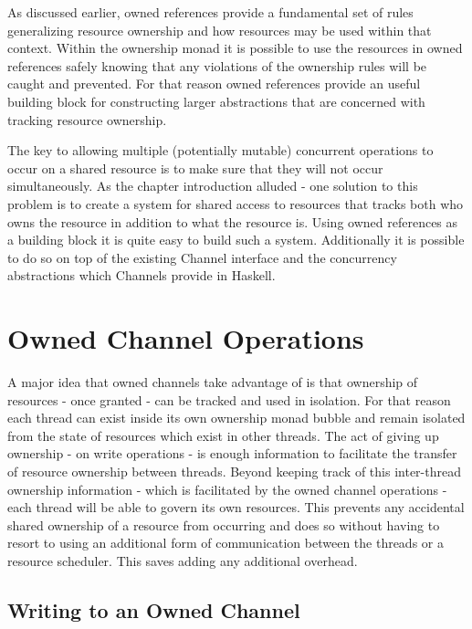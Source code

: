 \documentclass[onehalf,11pt]{beavtex}
\begin{document}
As discussed earlier, owned references provide a fundamental set of
rules generalizing resource ownership and how resources may be used within that
context.  Within the ownership monad it is possible to use the
resources in owned references safely knowing that any violations of
the ownership rules will be caught and prevented.  For that reason
owned references provide an useful building block for constructing
larger abstractions that are concerned with tracking resource ownership.

The key to allowing multiple (potentially mutable) concurrent operations to occur
on a shared resource is to make sure that they will not occur simultaneously.
As the chapter introduction alluded - one solution to this problem is to
create a system for shared access to resources that tracks both who owns the
resource in addition to what the resource is.
Using owned references as a building block it is quite easy to build
such a system. Additionally it is possible to do so on top of the existing
Channel interface and the concurrency abstractions which Channels provide in
Haskell.


\section{Owned Channel Operations}

A major idea that owned channels take advantage of is that ownership
of resources - once granted - can be tracked and used in isolation. For that reason
each thread can exist inside its own ownership monad bubble and
remain isolated from the state of resources which exist in other threads.
The act of giving up ownership - on write operations - is enough information to
facilitate the transfer of resource ownership between threads.
Beyond keeping track of this inter-thread ownership information - which is
facilitated by the owned channel operations - each thread will be able
to govern its own resources.  This prevents any accidental shared ownership of
a resource from occurring and does so without having to resort to using an
additional form of communication between the threads or a resource scheduler.
This saves adding any additional overhead.



\subsection{Writing to an Owned Channel}
\end{document}
